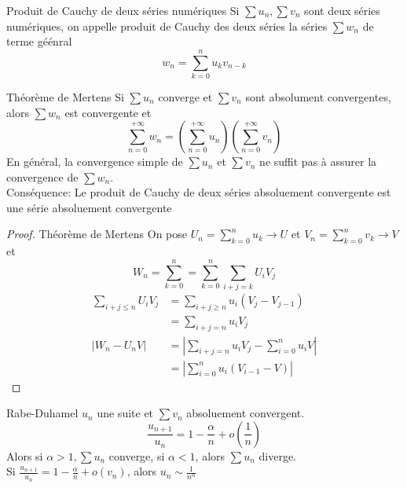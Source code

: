 \documentclass[]{report}
\begin{document}
\begin{df}{Produit de Cauchy de deux séries numériques}{}
    Si $\sum u_n,\sum v_n$ sont deux séries numériques, on appelle produit de Cauchy des deux séries la séries $\sum w_n$ de terme géénral
    \[w_n =\sum_{k=0}^{n} u_k v_{n-k}\]
\end{df}

\begin{tm}{Théorème de Mertens}{}
    Si $\sum u_n$ converge et $\sum v_n$ sont absolument convergentes, alors $\sum w_n$ est convergente et
    \[\sum_{n=0}^{+\infty} w_n=\left(\sum_{n=0}^{+\infty} u_n\right)\left(\sum_{n=0}^{+\infty} v_n\right)\]
    En général, la convergence simple de $\sum u_n$ et $\sum v_n$ ne suffit pas à assurer la convergence de $\sum w_n$.\\
    Conséquence: Le produit de Cauchy de deux séries absoluement convergente est une série absoluement convergente
\end{tm}

\begin{proof}{Théorème de Mertens}{}
    On pose $U_n=\sum_{k=0}^{n} u_k \to U$ et $V_n=\sum_{k=0}^{n} v_k\to V$ et
    \[W_n =\sum_{k=0}^{n} =\sum_{k=0}^{n} \sum_{i+j=k}U_i V_j\]
    \begin{align*}
        \sum_{i+j\le n} U_i V_j   & = \sum_{i+j\ge n} u_i \left( V_j- V_{j-1}\right)          \\
                                  & =\sum_{i+j=n} u_i V_j                                     \\
        \left| W_n - U_n V\right| & =\left|\sum_{i+j=n} u_i V_j - \sum_{i=0}^n u_i V\right|   \\
                                  & =\left| \sum_{i=0}^{n} u_i \left( V_{i-1}-V\right)\right|
    \end{align*}
\end{proof}

\begin{prop}{Rabe-Duhamel}{}
    $u_n$ une suite et $\sum v_n$ absoluement convergent.
    \[\frac{u_{n+1}}{u_n}=1-\frac{\alpha}{n} + o\left(\frac{1}{n}\right)\]
    Alors si $\alpha>1,\sum u_n$ converge, si $\alpha<1$, alors $\sum u_n $ diverge.\\
    Si $\frac{u_{n+1}}{u_n}=1-\frac{\alpha}{n}+o(v_n)$, alors $u_n \sim \frac{1}{n^\alpha}$
\end{prop}
\end{document}
